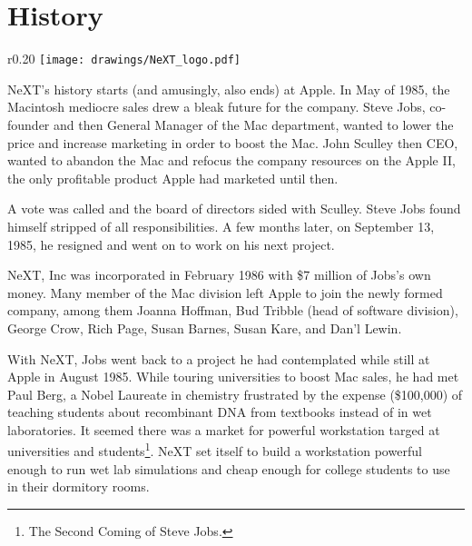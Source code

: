 \section{History}

\begin{wrapfigure}[8]{r}{0.20\textwidth}
\centering
\texttt{[image: drawings/NeXT\_logo.pdf]}

\end{wrapfigure}
\par
NeXT's history starts (and amusingly, also ends) at Apple. In May of 1985, the Macintosh mediocre sales drew a bleak future for the company. Steve Jobs, co-founder and then General Manager of the Mac department, wanted to lower the price and increase marketing in order to boost the Mac. John Sculley then CEO, wanted to abandon the Mac and refocus the company resources on the Apple II, the only profitable product Apple had marketed until then.\\
\par
 A vote was called and the board of directors sided with Sculley. Steve Jobs found himself stripped of all responsibilities. A few months later, on September 13, 1985, he resigned and went on to work on his next project.\\
\par
NeXT, Inc was incorporated in February 1986 with \$7 million of Jobs's own money. Many member of the Mac division left Apple to join the newly formed company, among them  Joanna Hoffman, Bud Tribble (head of software division), George Crow, Rich Page, Susan Barnes, Susan Kare, and Dan'l  Lewin.\\ 
\par
With NeXT, Jobs went back to a project he had contemplated while still at Apple in August 1985. While touring universities to boost Mac sales, he had met Paul Berg, a Nobel Laureate in chemistry frustrated by the expense (\$100,000) of teaching students about recombinant DNA from textbooks instead of in wet laboratories. It seemed there was a market for powerful workstation targed at universities and students\footnote{The Second Coming of Steve Jobs.}. NeXT set itself to build a workstation powerful enough to run wet lab simulations and cheap enough for college students to use in their dormitory rooms.\\
\par
{}
\par
